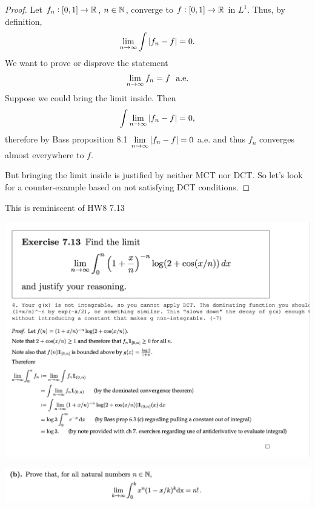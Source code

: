 \begin{proof}
  Let $f_n: [0, 1] \to \mathbb{R}$, $n \in \mathbb{N}$, converge to $f: [0, 1] \to \mathbb{R}$ in $L^1$. Thus, by definition,
  \begin{align*}
    \limninf \int |f_n - f| = 0.
  \end{align*}
  We want to prove or disprove the statement
  \begin{align*}
    \limn f_n = f \ae
  \end{align*}
  Suppose we could bring the limit inside. Then
  \begin{align*}
    \int \limninf |f_n - f| = 0,
  \end{align*}
  therefore by Bass proposition 8.1 $\limninf |f_n - f| = 0$ a.e. and thus $f_n$ converges almost everywhere to $f$.

  But bringing the limit inside is justified by neither MCT nor DCT. So let's look for a counter-example based
  on not satisfying DCT conditions.

\end{proof}

This is reminiscent of HW8 7.13

\begin{mdframed}
\includegraphics[width=400pt]{img/analysis--berkeley-202a-final-5921.png}
\end{mdframed}

\begin{mdframed}
\includegraphics[width=400pt]{img/analysis--berkeley-202a-final-96cc.png}
\end{mdframed}

